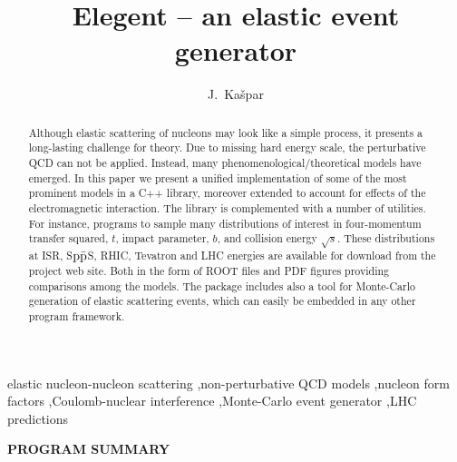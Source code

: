 \documentclass[preprint,12pt]{elsarticle}
\begin{document}
\begin{frontmatter}

\title{Elegent -- an elastic event generator}

\author{J.~Ka\v spar}
\address{CERN, 1211 Geneva 23, Switzerland}



\begin{abstract}
Although elastic scattering of nucleons may look like a simple process, it presents a long-lasting challenge for theory. Due to missing hard energy scale, the perturbative QCD can not be applied. Instead, many phenomenological/theoretical models have emerged. In this paper we present a unified implementation of some of the most prominent models in a C++ library, moreover extended to account for effects of the electromagnetic interaction. The library is complemented with a number of utilities. For instance, programs to sample many distributions of interest in four-momentum transfer squared, $t$, impact parameter, $b$, and collision energy $\sqrt s$. These distributions at ISR, S$\rm p\bar p$S, RHIC, Tevatron and LHC energies are available for download from the project web site. Both in the form of ROOT files and PDF figures providing comparisons among the models. The package includes also a tool for Monte-Carlo generation of elastic scattering events, which can easily be embedded in any other program framework.
\end{abstract}

\begin{keyword}
elastic nucleon-nucleon scattering \sep non-perturbative QCD models \sep nucleon form factors \sep Coulomb-nuclear interference \sep Monte-Carlo event generator \sep LHC predictions

\end{keyword}

\end{frontmatter}


\newpage

\noindent
{\bf PROGRAM SUMMARY}
\end{document}
